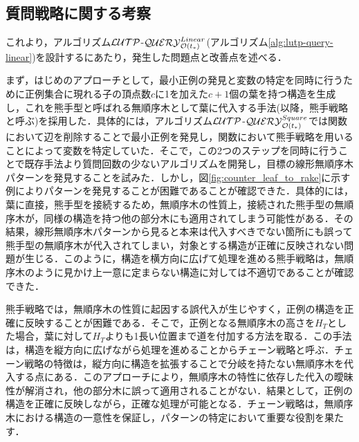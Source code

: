 \subsection{質問戦略に関する考察}
これより，アルゴリズム${\cal LUTP}$-${\cal QUERY}_{{\cal O}(t_{\ast})}^{Linear}$(アルゴリズム\ref{alg:lutp-query-linear})を設計するにあたり，発生した問題点と改善点を述べる．

まず，はじめのアプローチとして，最小正例の発見と変数の特定を同時に行うために正例集合に現れる子の頂点数$c$に1を加えた$c+1$個の葉を持つ構造を生成し，これを熊手型と呼ばれる無順序木として葉に代入する手法(以降，熊手戦略と呼ぶ)を採用した．具体的には，アルゴリズム${\cal LUTP}$-${\cal QUERY}_{{\cal O}(t_{\ast})}^{Square}$では関数において辺を削除することで最小正例を発見し，関数において熊手戦略を用いることによって変数を特定していた．そこで，この2つのステップを同時に行うことで既存手法より質問回数の少ないアルゴリズムを開発し，目標の線形無順序木パターンを発見することを試みた．しかし，図\ref{fig:counter_leaf_to_rake}に示す例によりパターンを発見することが困難であることが確認できた．具体的には，葉に直接，熊手型を接続するため，無順序木の性質上，接続された熊手型の無順序木が，同様の構造を持つ他の部分木にも適用されてしまう可能性がある．その結果，線形無順序木パターンから見ると本来は代入すべきでない箇所にも誤って熊手型の無順序木が代入されてしまい，対象とする構造が正確に反映されない問題が生じる．このように，構造を横方向に広げて処理を進める熊手戦略は，無順序木のように見かけ上一意に定まらない構造に対しては不適切であることが確認できた．

熊手戦略では，無順序木の性質に起因する誤代入が生じやすく，正例の構造を正確に反映することが困難である．そこで，正例となる無順序木の高さを$H_T$とした場合，葉に対して$H_T$よりも1長い位置まで道を付加する方法を取る．この手法は，構造を縦方向に広げながら処理を進めることからチェーン戦略と呼ぶ．チェーン戦略の特徴は，縦方向に構造を拡張することで分岐を持たない無順序木を代入する点にある．このアプローチにより，無順序木の特性に依存した代入の曖昧性が解消され，他の部分木に誤って適用されることがない．結果として，正例の構造を正確に反映しながら，正確な処理が可能となる．チェーン戦略は，無順序木における構造の一意性を保証し，パターンの特定において重要な役割を果たす．

